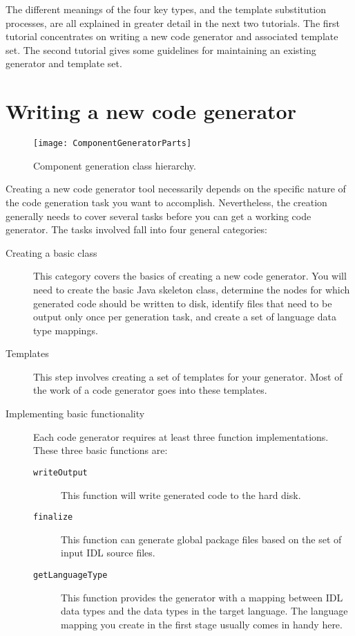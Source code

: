 The different meanings of the four key types, and the template substitution
processes, are all explained in greater detail in the next two tutorials. The
first tutorial concentrates on writing a new code generator and associated
template set. The second tutorial gives some guidelines for maintaining an
existing generator and template set.

\section{Writing a new code generator}

\begin{figure}
\centering
\texttt{[image: ComponentGeneratorParts]}
\caption{Component generation class hierarchy.}
\label{fig:component-generator-parts}
\end{figure}

Creating a new code generator tool necessarily depends on the specific nature of
the code generation task you want to accomplish. Nevertheless, the creation
generally needs to cover several tasks before you can get a working code
generator. The tasks involved fall into four general categories:

\begin{description}
\item [Creating a basic class] This category covers the basics of creating a new
      code generator. You will need to create the basic Java skeleton class,
      determine the nodes for which generated code should be written to disk,
      identify files that need to be output only once per generation task, and
      create a set of language data type mappings.
\item [Templates] This step involves creating a set of templates for your
      generator. Most of the work of a code generator goes into these templates.
\item [Implementing basic functionality] Each code generator requires at least
      three function implementations. These three basic functions are:
      \begin{description}
      \item [{\tt writeOutput}] This function will write generated code to the
            hard disk.
      \item [{\tt finalize}] This function can generate global package files
            based on the set of input IDL source files.
      \item [{\tt getLanguageType}] This function provides the generator with a
            mapping between IDL data types and the data types in the target
            language. The language mapping you create in the first stage usually
            comes in handy here.
      \end{description}
\end{description}

